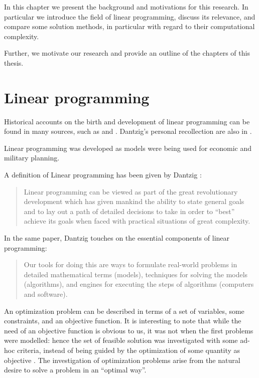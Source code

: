 
%
%
\label{ch:Introduction}

In this chapter we present the background and motivations for
this research. In particular we introduce the field of linear programming,
discuss its relevance, and compare some solution methods, in particular
with regard to their computational complexity.

Further, we motivate our research and provide an outline of the chapters
of this thesis.

%
%
\section{Linear programming}

Historical accounts on the birth and development of linear programming 
can be found in many sources, such as \cite[ch.~2]{Dantzig63} and 
\cite{Schrijver86}. Dantzig's personal recollection are also
in \cite{Dantzig02}.

Linear programming was developed as models were being used for
economic and military planning.

A definition of Linear programming has been given by Dantzig \cite{Dantzig02}:
\begin{quote}
Linear programming can be viewed as part of the great revolutionary 
development which has given mankind the ability to state general goals
and to lay out a path of detailed decisions to take in order to ``best''
achieve its goals when faced with practical situations of great complexity.
\end{quote}

In the same paper, Dantzig touches on the essential components of linear
programming:
\begin{quote}
Our tools for doing this are ways to formulate real-world problems in
detailed mathematical terms (models), techniques for solving the models
(algorithms), and engines for executing the steps of algorithms
(computers and software).
\end{quote}

An optimization problem can be described in terms of a set of variables, 
some constraints, and an objective function. It is interesting to note
that while the need of an objective function is obvious to us, it was
not when the first problems were modelled: hence the set of feasible
solution was investigated with some ad-hoc criteria, instead of being
guided by the optimization of some quantity as objective \cite{Dantzig02}.
The investigation of optimization problems arise from the natural
desire to solve a problem in an ``optimal way''.

